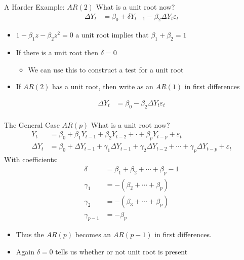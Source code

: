 \documentclass[aspectratio=169]{beamer}
\begin{document}
\begin{frame}{A Harder Example: $AR(2)$}
What is a unit root now?
\begin{align*}
\Delta Y_t &= \beta_0 + \delta Y_{t-1} - \beta_2 \Delta Y_t  \varepsilon_t
\end{align*}
\begin{itemize}
\item $1- \beta_1 z - \beta_2 z^2 = 0$ a unit root implies that $\beta_1 + \beta_2=1$
\item If there is a unit root then $\delta=0$
\begin{itemize}
\item We can use this to construct a test for a unit root
\end{itemize}
\item If $AR(2)$ has a unit root, then write as an $AR(1)$ in first differences
\end{itemize}
\begin{align*}
\Delta Y_t &= \beta_0 - \beta_2 \Delta Y_t  \varepsilon_t\\
\end{align*}
\end{frame}

\begin{frame}{The General Case $AR(p)$}
What is a unit root now?
\begin{align*}
Y_t &= \beta_0 + \beta_1 Y_{t-1} + \beta_2 Y_{t-2} + \cdot + \beta_p Y_{t-p} + \varepsilon_t\\
\Delta Y_t &= \beta_0 + \Delta Y_{t-1} + \gamma_1 \Delta Y_{t-1} + \gamma_2 \Delta Y_{t-2} +  \cdots +  \gamma_p \Delta Y_{t-p}  + \varepsilon_t
\end{align*}
With coefficients:
\begin{align*}
\delta &= \beta_1 + \beta_2 + \cdots + \beta_p -1\\
\gamma_1 &=  -(\beta_2 + \cdots + \beta_p)\\
\gamma_2 &=  -(\beta_3 + \cdots + \beta_p)\\
\gamma_{p-1} &=  -\beta_p
\end{align*}
\begin{itemize}
    \item Thus the $AR(p)$ becomes an $AR(p-1)$ in first differences.
    \item Again $\delta=0$ tells us whether or not unit root is present
\end{itemize}
\end{frame}
\end{document}
